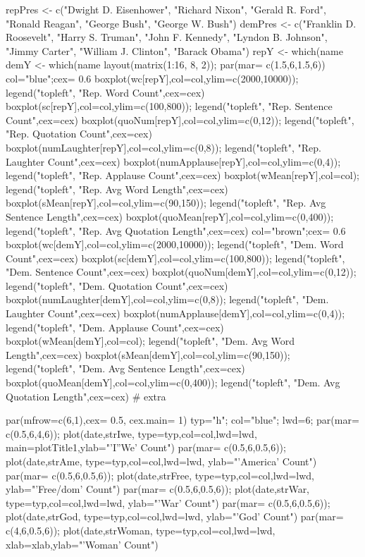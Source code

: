 \documentclass{article}
\begin{document}
repPres <- c("Dwight D. Eisenhower", "Richard Nixon", "Gerald R. Ford", 
             "Ronald Reagan", "George Bush", "George W. Bush")
demPres <- c("Franklin D. Roosevelt", "Harry S. Truman", "John F. Kennedy", 
             "Lyndon B. Johnson", "Jimmy Carter", "William J. Clinton", "Barack Obama")
repY <- which(name %
demY <- which(name %
layout(matrix(1:16, 8, 2)); par(mar= c(1.5,6,1.5,6))
col="blue";cex= 0.6
boxplot(wc[repY],col=col,ylim=c(2000,10000)); legend("topleft", "Rep. Word Count",cex=cex)
boxplot(sc[repY],col=col,ylim=c(100,800)); legend("topleft", "Rep. Sentence Count",cex=cex)
boxplot(quoNum[repY],col=col,ylim=c(0,12)); legend("topleft", "Rep. Quotation Count",cex=cex)
boxplot(numLaughter[repY],col=col,ylim=c(0,8)); legend("topleft", "Rep. Laughter Count",cex=cex)
boxplot(numApplause[repY],col=col,ylim=c(0,4)); legend("topleft", "Rep. Applause Count",cex=cex)
boxplot(wMean[repY],col=col); legend("topleft", "Rep. Avg Word Length",cex=cex)
boxplot(sMean[repY],col=col,ylim=c(90,150)); legend("topleft", "Rep. Avg Sentence Length",cex=cex)
boxplot(quoMean[repY],col=col,ylim=c(0,400)); legend("topleft", "Rep. Avg Quotation Length",cex=cex)
col="brown";cex= 0.6
boxplot(wc[demY],col=col,ylim=c(2000,10000)); legend("topleft", "Dem. Word Count",cex=cex)
boxplot(sc[demY],col=col,ylim=c(100,800)); legend("topleft", "Dem. Sentence Count",cex=cex)
boxplot(quoNum[demY],col=col,ylim=c(0,12)); legend("topleft", "Dem. Quotation Count",cex=cex)
boxplot(numLaughter[demY],col=col,ylim=c(0,8)); legend("topleft", "Dem. Laughter Count",cex=cex)
boxplot(numApplause[demY],col=col,ylim=c(0,4)); legend("topleft", "Dem. Applause Count",cex=cex)
boxplot(wMean[demY],col=col); legend("topleft", "Dem. Avg Word Length",cex=cex)
boxplot(sMean[demY],col=col,ylim=c(90,150)); legend("topleft", "Dem. Avg Sentence Length",cex=cex)
boxplot(quoMean[demY],col=col,ylim=c(0,400)); legend("topleft", "Dem. Avg Quotation Length",cex=cex)
# extra

par(mfrow=c(6,1),cex= 0.5, cex.main= 1)
typ="h"; col="blue"; lwd=6;
par(mar= c(0.5,6,4,6)); plot(date,strIwe, type=typ,col=col,lwd=lwd, main=plotTitle1,ylab="'I''We' Count")
par(mar= c(0.5,6,0.5,6)); plot(date,strAme, type=typ,col=col,lwd=lwd, ylab="'America' Count")
par(mar= c(0.5,6,0.5,6)); plot(date,strFree, type=typ,col=col,lwd=lwd, ylab="'Free/dom' Count")
par(mar= c(0.5,6,0.5,6)); plot(date,strWar, type=typ,col=col,lwd=lwd, ylab="'War' Count")
par(mar= c(0.5,6,0.5,6)); plot(date,strGod, type=typ,col=col,lwd=lwd, ylab="'God' Count") 
par(mar= c(4,6,0.5,6)); plot(date,strWoman, type=typ,col=col,lwd=lwd, xlab=xlab,ylab="'Woman' Count")
\end{document}
